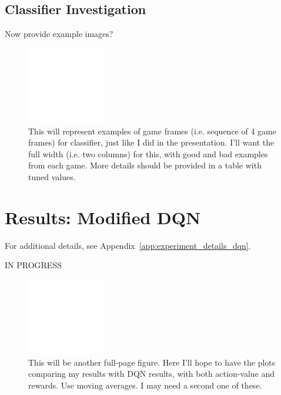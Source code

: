 \documentclass[letterpaper, 10pt, conference]{ieeeconf}
\begin{document}
\subsection{Classifier Investigation}

Now provide example images?

\begin{figure}[t]
\centering
\includegraphics[width=0.30\textwidth]{figures/empty.png}
\caption{\footnotesize
This will represent examples of game frames (i.e. sequence of 4 game frames) for
classifier, just like I did in the presentation. I'll want the full width (i.e.
two columns) for this, with good and bad examples from each game. More details
should be provided in a table with tuned values.
}
\label{fig:empty1}
\end{figure}



\section{Results: Modified DQN}\label{sec:results_p2}

For additional details, see Appendix~\ref{app:experiment_details_dqn}.

IN PROGRESS

\begin{figure}[t]
\centering
\includegraphics[width=0.30\textwidth]{figures/empty.png}
\caption{\footnotesize
This will be another full-page figure. Here I'll hope to have the plots
comparing my results with DQN results, with both action-value and rewards. Use
moving averages. I may need a second one of these.
}
\label{fig:empty2}
\end{figure}
\end{document}

